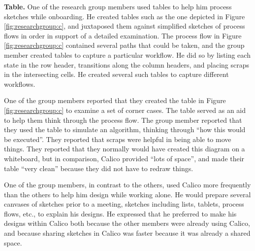 \documentclass[12pt,fleqn]{ucithesis}
\begin{document}


\textbf{Table.} One of the research group members used tables to help him process sketches while onboarding. He created tables such as the one depicted in Figure \ref{fig:researchgroup:c}, and juxtaposed them against simplified sketches of process flows in order in support of a detailed examination. The process flow in Figure \ref{fig:researchgroup:c} contained several paths that could be taken, and the group member created tables to capture a particular workflow. He did so by listing each state in the row header, transitions along the column headers, and placing scraps in the intersecting cells. He created several such tables to capture different workflows.

One of the group members reported that they created the table in Figure \ref{fig:researchgroup:c} to examine a set of corner cases. The table served as an aid to help them think through the process flow. The group member reported that they used the table to simulate an algorithm, thinking through ``how this would be executed''. They reported that scraps were helpful in being able to move things. They reported that they normally would have created this diagram on a whiteboard, but in comparison, Calico provided ``lots of space'', and made their table ``very clean'' because they did not have to redraw things. 


One of the group members, in contrast to the others, used Calico more frequently than the others to help him design while working alone. He would prepare several canvases of sketches prior to a meeting, sketches including lists, tablets, process flows, etc., to explain his designs. He expressed that he preferred to make his designs within Calico both because the other members were already using Calico, and because sharing sketches in Calico was faster because it was already a shared space.

%
%
%
\end{document}
